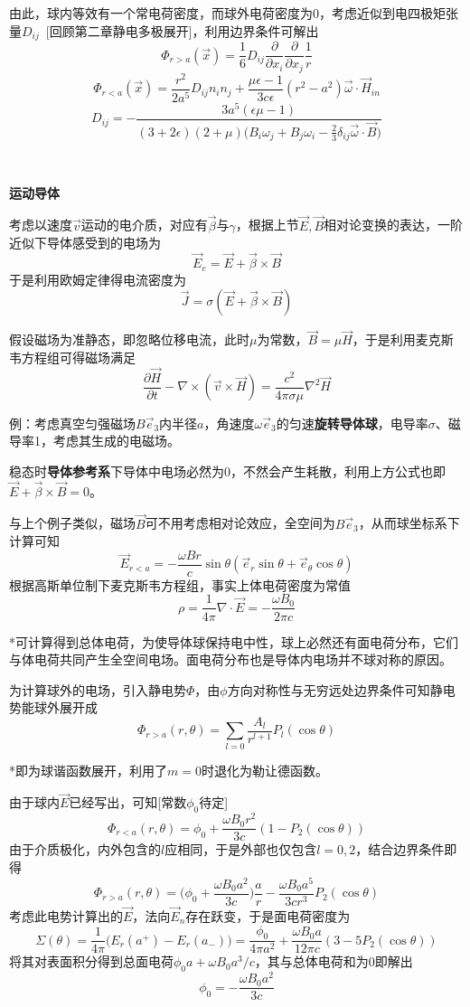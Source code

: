 \documentclass[a4paper,UTF8,fontset=windows]{ctexart}
\newcommand*{\vb}{\vec{B}}
\newcommand*{\ve}{\vec{E}}
\newcommand*{\vh}{\vec{H}}
\newcommand*{\vj}{\vec{J}}
\newcommand*{\ves}{\vec{e}}
\newcommand*{\vvs}{\vec{v}}
\newcommand*{\vx}{\vec{x}}
\newcommand*{\vbeta}{\vec{\beta}}
\newcommand*{\vomega}{\vec{\omega}}
\newcommand*{\pt}[2][t]{\frac{\partial #2}{\partial #1}}
\begin{document}
由此，球内等效有一个常电荷密度，而球外电荷密度为0，考虑近似到电四极矩张量$D_{ij}$\ [回顾第二章静电多极展开]，利用边界条件可解出
$$\Phi_{r>a}(\vx)=\frac{1}{6}D_{ij}\pt[x_i]{}\pt[x_j]{}\frac{1}{r}$$
$$\Phi_{r<a}(\vx)=\frac{r^2}{2a^5}D_{ij}n_in_j+\frac{\mu\epsilon-1}{3c\epsilon}(r^2-a^2)\vomega\cdot\vh_{in}$$
$$D_{ij}=-\frac{3a^5(\epsilon\mu-1)}{(3+2\epsilon)(2+\mu)\big(B_i\omega_j+B_j\omega_i-\frac{2}{3}\delta_{ij}\vomega\cdot\vb\big)}$$

\

\textbf{运动导体}

考虑以速度$\vvs$运动的电介质，对应有$\vbeta$与$\gamma$，根据上节$\ve,\vb$相对论变换的表达，一阶近似下导体感受到的电场为
$$\ve_e=\ve+\vbeta\times\vb$$
于是利用欧姆定律得电流密度为
$$\vj=\sigma(\ve+\vbeta\times\vb)$$

假设磁场为准静态，即忽略位移电流，此时$\mu$为常数，$\vb=\mu\vh$，于是利用麦克斯韦方程组可得磁场满足
$$\pt{\vh}-\nabla\times(\vvs\times\vh)=\frac{c^2}{4\pi\sigma\mu}\nabla^2\vh$$

例：考虑真空匀强磁场$B\ves_3$内半径$a$，角速度$\omega\ves_3$的匀速\textbf{旋转导体球}，电导率$\sigma$、磁导率1，考虑其生成的电磁场。

稳态时\textbf{导体参考系}下导体中电场必然为0，不然会产生耗散，利用上方公式也即$\ve+\vbeta\times\vb=0$。

与上个例子类似，磁场$\vb$可不用考虑相对论效应，全空间为$B\ves_3$，从而球坐标系下计算可知
$$\ve_{r<a}=-\frac{\omega Br}{c}\sin\theta(\ves_r\sin\theta+\ves_\theta\cos\theta)$$
根据高斯单位制下麦克斯韦方程组，事实上体电荷密度为常值
$$\rho=\frac{1}{4\pi}\nabla\cdot\ve=-\frac{\omega B_0}{2\pi c}$$

*可计算得到总体电荷，为使导体球保持电中性，球上必然还有面电荷分布，它们与体电荷共同产生全空间电场。面电荷分布也是导体内电场并不球对称的原因。

为计算球外的电场，引入静电势$\Phi$，由$\phi$方向对称性与无穷远处边界条件可知静电势能球外展开成
$$\Phi_{r>a}(r,\theta)=\sum_{l=0}\frac{A_l}{r^{l+1}}P_l(\cos\theta)$$

*即为球谐函数展开，利用了$m=0$时退化为勒让德函数。

由于球内$\ve$已经写出，可知[常数$\phi_0$待定]
$$\Phi_{r<a}(r,\theta)=\phi_0+\frac{\omega B_0r^2}{3c}(1-P_2(\cos\theta))$$
由于介质极化，内外包含的$l$应相同，于是外部也仅包含$l=0,2$，结合边界条件即得
$$\Phi_{r>a}(r,\theta)=\bigg(\phi_0+\frac{\omega B_0a^2}{3c}\bigg)\frac{a}{r}-\frac{\omega B_0a^5}{3cr^3}P_2(\cos\theta)$$
考虑此电势计算出的$\ve$，法向$\ve_n$存在跃变，于是面电荷密度为
$$\Sigma(\theta)=\frac{1}{4\pi}\big(E_r(a^+)-E_r(a_-)\big)=\frac{\phi_0}{4\pi a^2}+\frac{\omega B_0a}{12\pi c}(3-5P_2(\cos\theta))$$
将其对表面积分得到总面电荷$\phi_0a+\omega B_0a^3/c$，其与总体电荷和为0即解出
$$\phi_0=-\frac{\omega B_0a^2}{3c}$$
\end{document}
